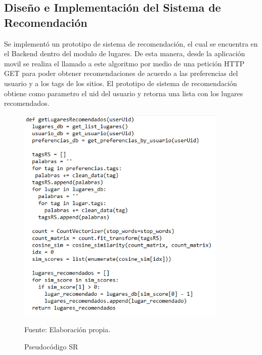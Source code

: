\documentclass[12pt,letterpaper,openany]{book}
\begin{document}
\subsection{Diseño e Implementación del Sistema de Recomendación}
Se implementó un prototipo de sistema de recomendación, el cual se encuentra en el Backend dentro del modulo de lugares. De esta manera, desde la aplicación movil se realiza el llamado a este algoritmo por medio de una petición HTTP GET para poder obtener recomendaciones de acuerdo a las preferencias del usuario y a los tags de los sitios.
\vspace{5mm}\newline
El prototipo de sistema de recomendación obtiene como parametro el uid del usuario y retorna una lista con los lugares recomendados.
\begin{figure}[H]
\begin{center}
\includegraphics[width=10cm]{./imagenes/codigoSR}
\caption{Pseudocódigo SR}
\centering Fuente: Elaboración propia.
\end{center}
\end{figure}
\end{document}

